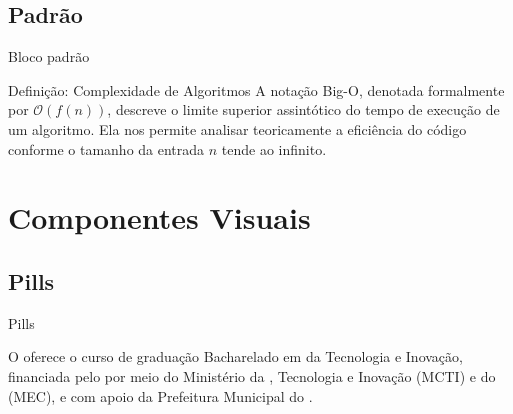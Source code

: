 \documentclass[aspectratio=169]{beamer}
\begin{document}
\subsection{Padrão}

\begin{frame}{Bloco padrão}


    \begin{block}{Definição: Complexidade de Algoritmos}
        A notação Big-O, denotada formalmente por $\mathcal{O}(f(n))$, descreve o limite superior 
        assintótico do tempo de execução de um algoritmo. Ela nos permite analisar 
        teoricamente a eficiência do código conforme o tamanho da entrada $n$ tende ao 
        infinito.
    \end{block}
    
\end{frame}


\section{Componentes Visuais}

\subsection{Pills}


\begin{frame}{Pills}

    O  oferece o curso de graduação Bacharelado em  da Tecnologia e Inovação, 
    financiada pelo  por meio do Ministério da , Tecnologia e Inovação (MCTI) 
    e do  (MEC), e com apoio da Prefeitura Municipal do .
\end{frame}
\end{document}
